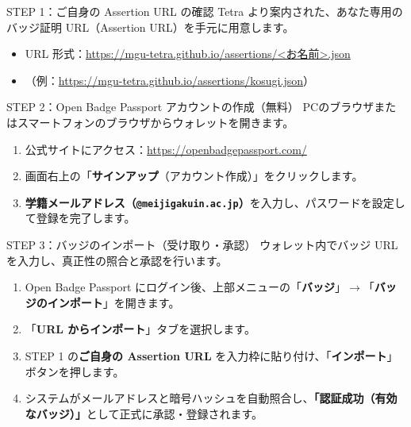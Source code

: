 \documentclass[10.5pt,a4paper]{ltjsarticle}
\begin{document}
\vspace{1.5mm}

\begin{stepcard}{STEP 1：ご自身の Assertion URL の確認}
    Tetra より案内された、あなた専用のバッジ証明 URL（Assertion URL）を手元に用意します。
    \begin{itemize}[leftmargin=14pt, itemsep=0.5pt, topsep=1pt]
        \item URL 形式：\url{https://mgu-tetra.github.io/assertions/<お名前>.json}
        \item （例：\url{https://mgu-tetra.github.io/assertions/kosugi.json}）
    \end{itemize}
\end{stepcard}

\vspace{1.5mm}

\begin{stepcard}{STEP 2：Open Badge Passport アカウントの作成（無料）}
    PCのブラウザまたはスマートフォンのブラウザからウォレットを開きます。
    \begin{enumerate}[leftmargin=14pt, itemsep=0.5pt, topsep=1pt]
        \item 公式サイトにアクセス：\url{https://openbadgepassport.com/}
        \item 画面右上の「\textbf{サインアップ}（アカウント作成）」をクリックします。
        \item \textbf{学籍メールアドレス（\texttt{@meijigakuin.ac.jp}）}を入力し、パスワードを設定して登録を完了します。
    \end{enumerate}
\end{stepcard}

\vspace{1.5mm}

\begin{stepcard}{STEP 3：バッジのインポート（受け取り・承認）}
    ウォレット内でバッジ URL を入力し、真正性の照合と承認を行います。
    \begin{enumerate}[leftmargin=14pt, itemsep=0.5pt, topsep=1pt]
        \item Open Badge Passport にログイン後、上部メニューの「\textbf{バッジ}」$\rightarrow$「\textbf{バッジのインポート}」を開きます。
        \item 「\textbf{URL からインポート}」タブを選択します。
        \item STEP 1 の\textbf{ご自身の Assertion URL} を入力枠に貼り付け、「\textbf{インポート}」ボタンを押します。
        \item システムがメールアドレスと暗号ハッシュを自動照合し、\textbf{「認証成功（有効なバッジ）」}として正式に承認・登録されます。
    \end{enumerate}
\end{stepcard}
\end{document}
